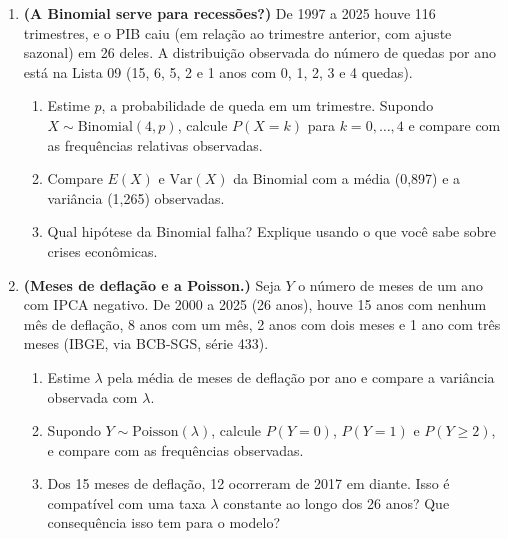 \documentclass[11pt]{article}
\begin{document}
\begin{enumerate}[label=\textbf{A\arabic*.}, leftmargin=*]
\item \textbf{(A Binomial serve para recessões?)} De 1997 a 2025 houve 116 trimestres, e o PIB caiu (em relação ao trimestre anterior, com ajuste sazonal)
em 26 deles. A distribuição observada do número de quedas por ano está na Lista 09 (15, 6, 5, 2 e 1 anos com 0, 1, 2, 3 e 4 quedas).
\begin{enumerate}[label=(\alph*)]
  \item Estime $p$, a probabilidade de queda em um trimestre. Supondo $X \sim \mathrm{Binomial}(4, p)$, calcule $P(X = k)$ para $k = 0, \ldots, 4$ e
    compare com as frequências relativas observadas.
  \item Compare $E(X)$ e $\mathrm{Var}(X)$ da Binomial com a média (0,897) e a variância (1,265) observadas.
  \item Qual hipótese da Binomial falha? Explique usando o que você sabe sobre crises econômicas.
\end{enumerate}

\item \textbf{(Meses de deflação e a Poisson.)} Seja $Y$ o número de meses de um ano com IPCA negativo. De 2000 a 2025 (26 anos), houve 15 anos com
nenhum mês de deflação, 8 anos com um mês, 2 anos com dois meses e 1 ano com três meses (IBGE, via BCB-SGS, série 433).
\begin{enumerate}[label=(\alph*)]
  \item Estime $\lambda$ pela média de meses de deflação por ano e compare a variância observada com $\lambda$.
  \item Supondo $Y \sim \mathrm{Poisson}(\lambda)$, calcule $P(Y = 0)$, $P(Y = 1)$ e $P(Y \geq 2)$, e compare com as frequências observadas.
  \item Dos 15 meses de deflação, 12 ocorreram de 2017 em diante. Isso é compatível com uma taxa $\lambda$ constante ao longo dos 26 anos? Que consequência isso tem para o modelo?
\end{enumerate}

\end{enumerate}
\end{document}
